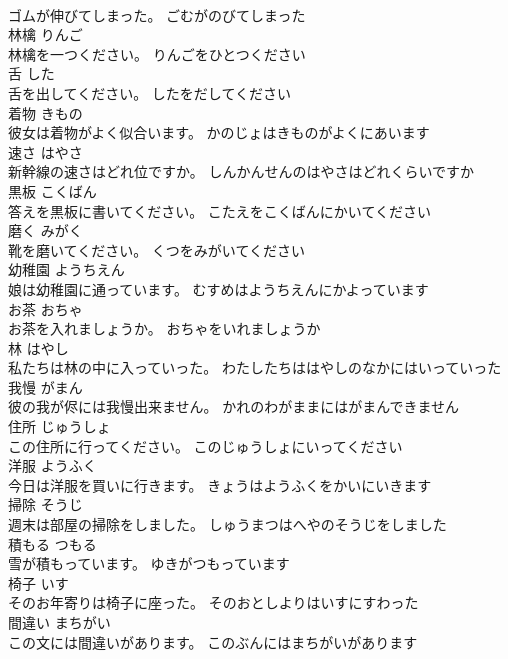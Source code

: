 \documentclass[8pt]{extreport}
\begin{document}
\begin{CJK}{UTF8}{min}
\\	ゴムが伸びてしまった。	ごむがのびてしまった	
\\	林檎	りんご	
\\	林檎を一つください。	りんごをひとつください	
\\	舌	した	
\\	舌を出してください。	したをだしてください	
\\	着物	きもの	
\\	彼女は着物がよく似合います。	かのじょはきものがよくにあいます	
\\	速さ	はやさ	
\\	新幹線の速さはどれ位ですか。	しんかんせんのはやさはどれくらいですか	
\\	黒板	こくばん	
\\	答えを黒板に書いてください。	こたえをこくばんにかいてください	
\\	磨く	みがく	
\\	靴を磨いてください。	くつをみがいてください	
\\	幼稚園	ようちえん	
\\	娘は幼稚園に通っています。	むすめはようちえんにかよっています	
\\	お茶	おちゃ	
\\	お茶を入れましょうか。	おちゃをいれましょうか	
\\	林	はやし	
\\	私たちは林の中に入っていった。	わたしたちははやしのなかにはいっていった	
\\	我慢	がまん	
\\	彼の我が侭には我慢出来ません。	かれのわがままにはがまんできません	
\\	住所	じゅうしょ	
\\	この住所に行ってください。	このじゅうしょにいってください	
\\	洋服	ようふく	
\\	今日は洋服を買いに行きます。	きょうはようふくをかいにいきます	
\\	掃除	そうじ	
\\	週末は部屋の掃除をしました。	しゅうまつはへやのそうじをしました	
\\	積もる	つもる	
\\	雪が積もっています。	ゆきがつもっています	
\\	椅子	いす	
\\	そのお年寄りは椅子に座った。	そのおとしよりはいすにすわった	
\\	間違い	まちがい	
\\	この文には間違いがあります。	このぶんにはまちがいがあります	

\end{CJK}
\end{document}
